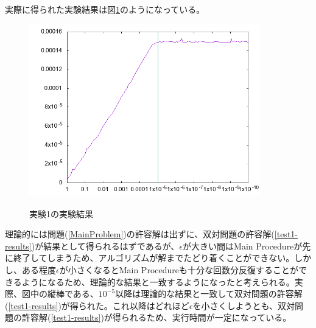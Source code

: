 実際に得られた実験結果は図\ref{test1}のようになっている。
\begin{figure}
  \centering
  \includegraphics[width=10cm]{test1.png}
  \label{test1}
  \caption{実験1の実験結果}
\end{figure}

理論的には問題(\ref{MainProblem})の許容解は出ずに、双対問題の許容解(\ref{test1-results})が結果として得られるはずであるが、$\epsilon$が大きい間はMain Procedureが先に終了してしまうため、アルゴリズムが解までたどり着くことができない。しかし、ある程度$\epsilon$が小さくなるとMain Procedureも十分な回数分反復することができるようになるため、理論的な結果と一致するようになったと考えられる。実際、図中の縦棒である、$10^{-5}$以降は理論的な結果と一致して双対問題の許容解(\ref{test1-results})が得られた。これ以降はどれほど$\epsilon$を小さくしようとも、双対問題の許容解(\ref{test1-results})が得られるため、実行時間が一定になっている。

